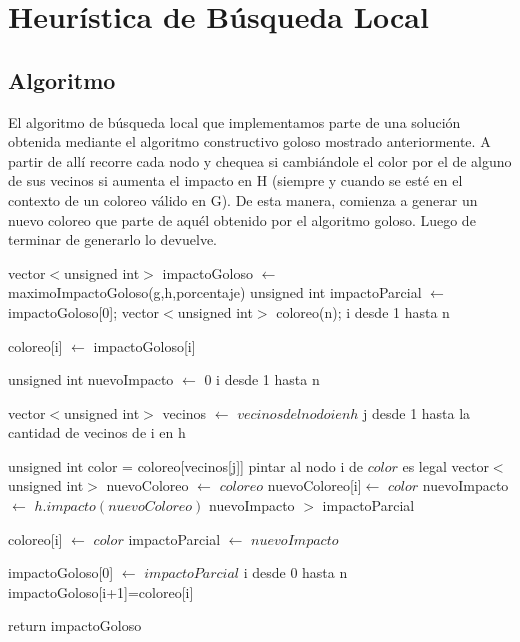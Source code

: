 \section{Heurística de Búsqueda Local}

\subsection{Algoritmo}

\indent El algoritmo de búsqueda local que implementamos parte de una solución obtenida mediante el algoritmo constructivo goloso mostrado anteriormente. A partir de allí recorre cada nodo y chequea si cambiándole el color por el de alguno de sus vecinos si aumenta el impacto en H (siempre y cuando se esté en el contexto de un coloreo válido en G). De esta manera, comienza a generar un nuevo coloreo que parte de aquél obtenido por el algoritmo goloso. Luego de terminar de generarlo lo devuelve. \\

\begin{algorithm}[H]
\caption{} 
\begin{codebox}

\li
\li vector$<$unsigned int$>$ impactoGoloso  $\gets$ maximoImpactoGoloso(g,h,porcentaje)
\li unsigned int impactoParcial $\gets$ impactoGoloso[0];
\li vector$<$unsigned int$>$ coloreo(n);
\li
\li \For i desde 1 hasta n \Do
    
\li 	coloreo[i] $\gets$ impactoGoloso[i]
    
    \End
\li

\li unsigned int nuevoImpacto $\gets$ 0
\li
\li	\For i desde 1 hasta n \Do
	
\li
\li		vector$<$unsigned int$>$ vecinos $\gets$ $vecinos del nodo i en h$
\li
\li 	\For j desde 1 hasta la cantidad de vecinos de i en h \Do

\li				unsigned int color = coloreo[vecinos[j]]
\li
\li				\If pintar al nodo i de $color$ es legal \Do			
\li						vector$<$unsigned int$>$ nuevoColoreo $\gets$ \quad $coloreo$
\li						nuevoColoreo[i]$ \gets$ \quad $color$
\li                		nuevoImpacto $ \gets$ \quad $h.impacto(nuevoColoreo)$
\li
\li                		\If nuevoImpacto $>$ impactoParcial \Do
                
\li                			coloreo[i] $\gets$ \quad $color$
\li                   			impactoParcial $\gets$ \quad $nuevoImpacto$
                   		\End
\li
                \End
        \End
    \End

\li
\li		impactoGoloso[0] $\gets$ \quad $impactoParcial$
\li
\li \For i desde 0 hasta n \Do
\li		impactoGoloso[i+1]=coloreo[i]
	\End    

\li
\li return impactoGoloso
\End
\end{codebox}
\end{algorithm}

